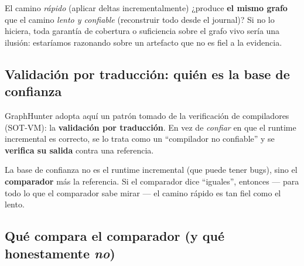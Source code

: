 \documentclass[11pt,a4paper]{article}
\newcommand{\term}[1]{\textcolor{ghblue}{\textbf{#1}}}
\begin{document}
\begin{ideabox}
El camino \emph{rápido} (aplicar deltas incrementalmente) ¿produce
\textbf{el mismo grafo} que el camino \emph{lento y confiable} (reconstruir
todo desde el journal)? Si no lo hiciera, toda garantía de cobertura o
suficiencia sobre el grafo vivo sería una ilusión: estaríamos razonando sobre
un artefacto que no es fiel a la evidencia.
\end{ideabox}

\subsection{Validación por traducción: quién es la base de confianza}

GraphHunter adopta aquí un patrón tomado de la verificación de compiladores
(SOT-VM): la \term{validación por traducción}. En vez de \emph{confiar} en que
el runtime incremental es correcto, se lo trata como un ``compilador no
confiable'' y se \textbf{verifica su salida} contra una referencia.

\begin{center}
\end{center}

La base de confianza no es el runtime incremental (que puede tener bugs), sino
el \textbf{comparador} más la referencia. Si el comparador dice ``iguales'',
entonces --- para todo lo que el comparador sabe mirar --- el camino rápido es
tan fiel como el lento.

\subsection{Qué compara el comparador (y qué honestamente \emph{no})}
\end{document}
